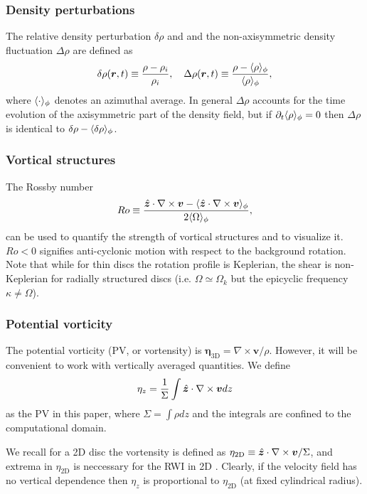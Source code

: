 \subsubsection{Density perturbations}
The relative density perturbation $\delta\rho$ and 
and the non-axisymmetric density fluctuation $\Delta\rho$ are defined as 
\begin{align}
  \delta\rho(\bm{r},t) \equiv \frac{\rho - \rho_i}{\rho_i}, \quad
  \Delta\rho(\bm{r},t) \equiv \frac{\rho -
    \langle \rho \rangle_\phi}{\langle \rho \rangle_\phi}, 
\end{align} 
where $\langle \cdot \rangle_\phi$ denotes an azimuthal average.  
In general $\Delta\rho$ accounts for the time evolution of 
the axisymmetric part of the density field, but if
$\partial_t\langle \rho \rangle_\phi=0$ then $\Delta\rho$ is identical to
$\delta\rho-\langle \delta\rho \rangle_\phi$.    

\subsubsection{Vortical structures}
The Rossby number
\begin{align}
  Ro \equiv
  \frac{\hat{\bm{z}}\cdot\nabla\times\bm{v}-\langle \hat{\bm{z}}\cdot\nabla\times\bm{v} \rangle_\phi}{2\langle \Omega \rangle_\phi},   
\end{align} 
can be used to quantify the strength of vortical structures and to
visualize it. $Ro<0$ signifies anti-cyclonic motion with respect to
the background rotation. Note that while for thin discs 
the rotation profile is Keplerian, the shear is non-Keplerian for radially  
structured discs (i.e. $\Omega\simeq\Omega_k$ but the epicyclic
frequency $\kappa\neq\Omega$). 

\subsubsection{Potential vorticity}
The potential vorticity (PV, or vortensity) is 
$  \bm{\eta}_\mathrm{3D} = \nabla\times\bm{v}/\rho$. 
However, it will be convenient to work with vertically averaged
quantities. We define  
\begin{align}
  \eta_z = \frac{1}{\Sigma}\int \hat{\bm{z}}\cdot\nabla\times\bm{v} dz
\end{align}
as the PV in this paper, where $\Sigma = \int\rho dz$ and the
integrals are confined to the computational domain. 

We recall for a 2D disc the vortensity is defined as 
$\eta_\mathrm{2D} \equiv \hat{\bm{z}}\cdot\nabla\times\bm{v}/\Sigma$, and
extrema in $\eta_\mathrm{2D}$ is neccessary for the RWI in
2D \citep{lovelace99,lin10}. Clearly, if the velocity field has no
vertical dependence then $\eta_z$ is proportional to
$\eta_\mathrm{2D}$ (at fixed cylindrical radius).   

